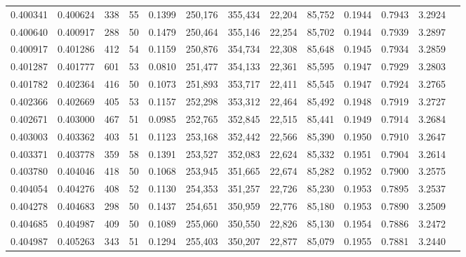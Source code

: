 \begin{tabular}{rrrrrrrrrrrrr}
0.400341 & 0.400624 &   338 &  55 &                                     0.1399 & 250,176 & 355,434 &  22,204 &  85,752 & 0.1944 & 0.7943 & 3.2924 \\
0.400640 & 0.400917 &   288 &  50 &                                     0.1479 & 250,464 & 355,146 &  22,254 &  85,702 & 0.1944 & 0.7939 & 3.2897 \\
0.400917 & 0.401286 &   412 &  54 &                                     0.1159 & 250,876 & 354,734 &  22,308 &  85,648 & 0.1945 & 0.7934 & 3.2859 \\
0.401287 & 0.401777 &   601 &  53 &                                     0.0810 & 251,477 & 354,133 &  22,361 &  85,595 & 0.1947 & 0.7929 & 3.2803 \\
0.401782 & 0.402364 &   416 &  50 &                                     0.1073 & 251,893 & 353,717 &  22,411 &  85,545 & 0.1947 & 0.7924 & 3.2765 \\
0.402366 & 0.402669 &   405 &  53 &                                     0.1157 & 252,298 & 353,312 &  22,464 &  85,492 & 0.1948 & 0.7919 & 3.2727 \\
0.402671 & 0.403000 &   467 &  51 &                                     0.0985 & 252,765 & 352,845 &  22,515 &  85,441 & 0.1949 & 0.7914 & 3.2684 \\
0.403003 & 0.403362 &   403 &  51 &                                     0.1123 & 253,168 & 352,442 &  22,566 &  85,390 & 0.1950 & 0.7910 & 3.2647 \\
0.403371 & 0.403778 &   359 &  58 &                                     0.1391 & 253,527 & 352,083 &  22,624 &  85,332 & 0.1951 & 0.7904 & 3.2614 \\
0.403780 & 0.404046 &   418 &  50 &                                     0.1068 & 253,945 & 351,665 &  22,674 &  85,282 & 0.1952 & 0.7900 & 3.2575 \\
0.404054 & 0.404276 &   408 &  52 &                                     0.1130 & 254,353 & 351,257 &  22,726 &  85,230 & 0.1953 & 0.7895 & 3.2537 \\
0.404278 & 0.404683 &   298 &  50 &                                     0.1437 & 254,651 & 350,959 &  22,776 &  85,180 & 0.1953 & 0.7890 & 3.2509 \\
0.404685 & 0.404987 &   409 &  50 &                                     0.1089 & 255,060 & 350,550 &  22,826 &  85,130 & 0.1954 & 0.7886 & 3.2472 \\
0.404987 & 0.405263 &   343 &  51 &                                     0.1294 & 255,403 & 350,207 &  22,877 &  85,079 & 0.1955 & 0.7881 & 3.2440 \\

\end{tabular}
